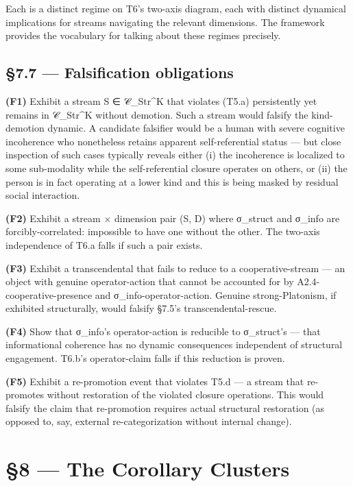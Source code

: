 \documentclass[11pt, openany]{book}
\newcommand{\sectionbreak}{\clearpage}
\begin{document}
Each is a distinct regime on T6's two-axis diagram, each with distinct dynamical implications for streams navigating the relevant dimensions. The framework provides the vocabulary for talking about these regimes precisely.

\sectionbreak

\section{§7.7 --- Falsification obligations}

\textbf{(F1)} Exhibit a stream S ∈ 𝒞\_\allowbreak{}Str\textasciicircum{}K that violates (T5.a) persistently yet remains in 𝒞\_\allowbreak{}Str\textasciicircum{}K without demotion. Such a stream would falsify the kind-demotion dynamic. A candidate falsifier would be a human with severe cognitive incoherence who nonetheless retains apparent self-referential status --- but close inspection of such cases typically reveals either (i) the incoherence is localized to some sub-modality while the self-referential closure operates on others, or (ii) the person is in fact operating at a lower kind and this is being masked by residual social interaction.

\textbf{(F2)} Exhibit a stream × dimension pair (S, D) where σ\_\allowbreak{}struct and σ\_\allowbreak{}info are forcibly-correlated: impossible to have one without the other. The two-axis independence of T6.a falls if such a pair exists.

\textbf{(F3)} Exhibit a transcendental that fails to reduce to a cooperative-stream --- an object with genuine operator-action that cannot be accounted for by A2.4-cooperative-presence and σ\_\allowbreak{}info-operator-action. Genuine strong-Platonism, if exhibited structurally, would falsify §7.5's transcendental-rescue.

\textbf{(F4)} Show that σ\_\allowbreak{}info's operator-action is reducible to σ\_\allowbreak{}struct's --- that informational coherence has no dynamic consequences independent of structural engagement. T6.b's operator-claim falls if this reduction is proven.

\textbf{(F5)} Exhibit a re-promotion event that violates T5.d --- a stream that re-promotes without restoration of the violated closure operations. This would falsify the claim that re-promotion requires actual structural restoration (as opposed to, say, external re-categorization without internal change).

\chapter{§8 — The Corollary Clusters}
\end{document}
